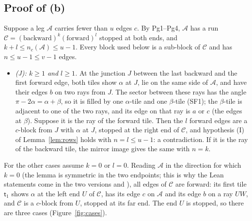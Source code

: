 \documentclass[11pt,reqno]{amsart}
\theoremstyle{plain}
\theoremstyle{definition}
\begin{document}
\subsection{Proof of (b)}\label{sub:proof34b}
Suppose a leg $\mathcal A$ carries fewer than $u$ edges $c$. By Pg1--Pg4, $\mathcal A$ has a run $\mathcal C=(\text{backward})^k(\text{forward})^l$ stopped at both ends, and $k+l\le n_c(\mathcal A)\le u-1$. Every block used below is a sub-block of $\mathcal C$ and has $n\le u-1\le v-1$ edges.
\begin{itemize}
\item[\textbf{Cs1}] \emph{(J): $k\ge1$ and $l\ge1$.} At the junction $J$ between the last backward and the first forward edge, both tiles show $\alpha$ at $J$, lie on the same side of $\mathcal A$, and have their edges $b$ on two rays from $J$. The sector between these rays has the angle $\pi-2\alpha=\alpha+\beta$, so it is filled by one $\alpha$-tile and one $\beta$-tile (SF1); the $\beta$-tile is adjacent to one of the two rays, and its edge on that ray is $a$ or $c$ (the edges at $\beta$). Suppose it is the ray of the forward tile. Then the $l$ forward edges are a $c$-block from $J$ with $\alpha$ at $J$, stopped at the right end of $\mathcal C$, and hypothesis (I) of Lemma~\ref{lem:rows} holds with $n=l\le u-1$: a contradiction. If it is the ray of the backward tile, the mirror image gives the same with $n=k$.
\end{itemize}
For the other cases assume $k=0$ or $l=0$. Reading $\mathcal A$ in the direction for which $k=0$ (the lemma is symmetric in the two endpoints; this is why the Lean statements come in the two versions  and ), all edges of $\mathcal C$ are forward: its first tile $\mathsf t_1$ shows $\alpha$ at the left end $U$ of $\mathcal C$, has its edge $c$ on $\mathcal A$ and its edge $b$ on a ray $UW$, and $\mathcal C$ is a $c$-block from $U$, stopped at its far end. The end $U$ is stopped, so there are three cases (Figure~\ref{fig:cases}).
\end{document}

